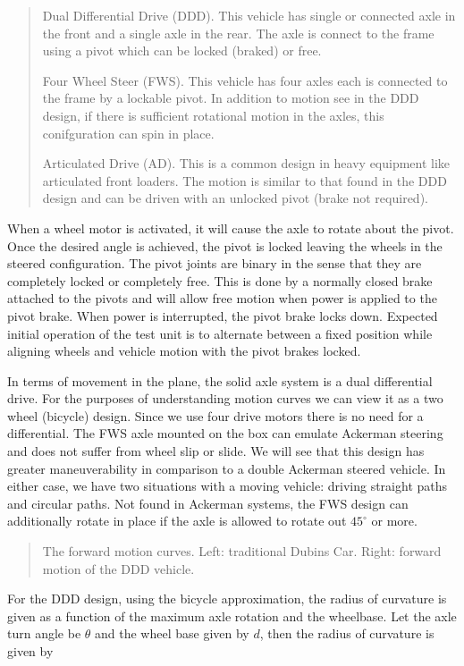 \begin{quote}
Dual Differential Drive (DDD). This vehicle has single or connected axle
in the front and a single axle in the rear. The axle is connect to the
frame using a pivot which can be locked (braked) or free.

Four Wheel Steer (FWS). This vehicle has four axles each is connected to
the frame by a lockable pivot. In addition to motion see in the DDD
design, if there is sufficient rotational motion in the axles, this
conifguration can spin in place.

Articulated Drive (AD). This is a common design in heavy equipment like
articulated front loaders. The motion is similar to that found in the
DDD design and can be driven with an unlocked pivot (brake not
required).
\end{quote}

When a wheel motor is activated, it will cause the axle to rotate about
the pivot. Once the desired angle is achieved, the pivot is locked
leaving the wheels in the steered configuration. The pivot joints are
binary in the sense that they are completely locked or completely free.
This is done by a normally closed brake attached to the pivots and will
allow free motion when power is applied to the pivot brake. When power
is interrupted, the pivot brake locks down. Expected initial operation
of the test unit is to alternate between a fixed position while aligning
wheels and vehicle motion with the pivot brakes locked.

In terms of movement in the plane, the solid axle system is a dual
differential drive. For the purposes of understanding motion curves we
can view it as a two wheel (bicycle) design. Since we use four drive
motors there is no need for a differential. The FWS axle mounted on the
box can emulate Ackerman steering and does not suffer from wheel slip or
slide. We will see that this design has greater maneuverability in
comparison to a double Ackerman steered vehicle. In either case, we have
two situations with a moving vehicle: driving straight paths and
circular paths. Not found in Ackerman systems, the FWS design can
additionally rotate in place if the axle is allowed to rotate out
\(45^\circ\) or more.

\begin{quote}
The forward motion curves. Left: traditional Dubins Car. Right: forward
motion of the DDD vehicle.
\end{quote}

For the DDD design, using the bicycle approximation, the radius of
curvature is given as a function of the maximum axle rotation and the
wheelbase. Let the axle turn angle be \(\theta\) and the wheel base
given by \(d\), then the radius of curvature is given by

